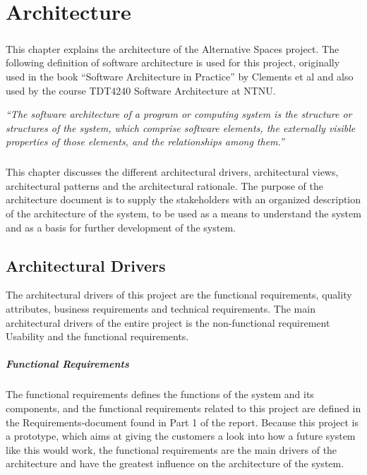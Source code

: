 \documentclass[11pt]{report}
\begin{document}
\chapter{Architecture}

\paragraph{} This chapter explains the architecture of the Alternative Spaces project. The following definition of software architecture is used for this project, originally used in the book ``Software Architecture in Practice'' by Clements et al and also used by the course TDT4240 Software Architecture at NTNU. 

\bigskip
\hfill\begin{minipage}{\dimexpr\textwidth-1cm}
\emph{``The software architecture of a program or computing system is the structure or structures of the system, which comprise software elements, the externally visible properties of those elements, and the relationships among them.''}
\end{minipage}

\paragraph{} This chapter discusses the different architectural drivers, architectural views, architectural patterns and the architectural rationale. The purpose of the architecture document is to supply the stakeholders with an organized description of the architecture of the system, to be used as a means to understand the system and as a basis for further development of the system. 

\newpage
\section{Architectural Drivers}

The architectural drivers of this project are the functional requirements, quality attributes, business requirements and technical requirements. The main architectural drivers of the entire project is the non-functional requirement Usability and the functional requirements. 

\paragraph{Functional Requirements}
The functional requirements defines the functions of the system and its components, and the functional requirements related to this project are defined in the Requirements-document found in Part 1 of the report. Because this project is a prototype, which aims at giving the customers a look into how a future system like this would work, the functional requirements are the main drivers of the architecture and have the greatest influence on the architecture of the system. 
\end{document}

